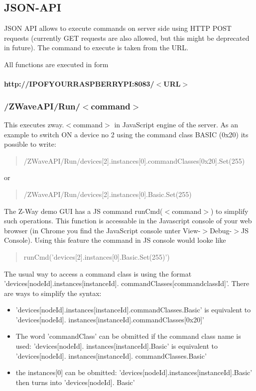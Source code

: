 \subsection{JSON-API}

JSON API allows to execute commands on server side using HTTP POST requests (currently GET requests are also allowed, 
but this might be deprecated in future). The command to execute is taken from the URL.

All functions are executed in form 

\paragraph{http://IPOFYOURRASPBERRYPI:8083/$<$URL$>$}


\subsubsection{/ZWaveAPI/Run/$<$command$>$}

This executes zway.$<$command$>$ in JavaScript engine of the server. As an example to switch ON a device no 2 using the
command class BASIC (0x20) its possible to write:

\begin{quote}/ZWaveAPI/Run/devices[2].instances[0].commandClasses[0x20].Set(255)\end{quote}

or

\begin{quote}/ZWaveAPI/Run/devices[2].instances[0].Basic.Set(255)\end{quote}



The Z-Way demo GUI has a JS command runCmd($<$command$>$) to simplify such operations. This function 
is accessable in the Javascript console of your web browser (in Chrome you find the JavaScript 
console unter View-$>$Debug-$>$JS Console). Using this feature the command in JS console would looke like

\begin{quote}runCmd('devices[2].instances[0].Basic.Set(255)')\end{quote}




The usual way to access a command class is using the format 'devices[nodeId].instances[instanceId].
commandClasses[commandclassId]'.
There are ways to simplify the syntax:
\begin{itemize}
\item 'devices[nodeId].instances[instanceId].commandClasses.Basic' is equivalent to 'devices[nodeId].
instances[instanceId].commandClasses[0x20]'
\item The word 'commandClass' can be obmitted if the command class name is used: 'devices[nodeId].
instances[instanceId].Basic' is equivalent to 'devices[nodeId]. instances[instanceId]. commandClasses.Basic'
\item the instances[0] can be obmitted:  'devices[nodeId].instances[instanceId].Basic' then turns into 'devices[nodeId].
Basic'
\end{itemize} 

